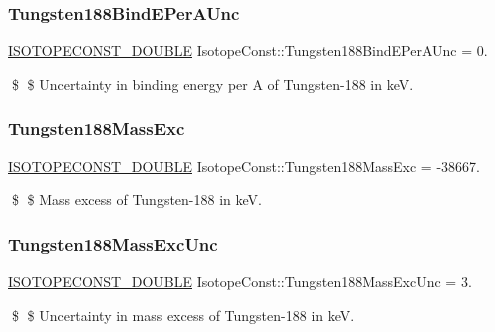 \subsubsection{\texorpdfstring{Tungsten188\+Bind\+E\+Per\+A\+Unc}{Tungsten188BindEPerAUnc}}
{\footnotesize\ttfamily \mbox{\hyperlink{group___isotope_const-_macros_ga8f45a7272ce02c0b4c65c44636ed719a}{I\+S\+O\+T\+O\+P\+E\+C\+O\+N\+S\+T\+\_\+\+D\+O\+U\+B\+LE}} Isotope\+Const\+::\+Tungsten188\+Bind\+E\+Per\+A\+Unc = 0.}

\$ \$ Uncertainty in binding energy per A of Tungsten-\/188 in keV. \mbox{\label{group___isotope_const-_tungsten-_w188_gafd20da016cd071a724fff9b652060a7f}} 
\subsubsection{\texorpdfstring{Tungsten188\+Mass\+Exc}{Tungsten188MassExc}}
{\footnotesize\ttfamily \mbox{\hyperlink{group___isotope_const-_macros_ga8f45a7272ce02c0b4c65c44636ed719a}{I\+S\+O\+T\+O\+P\+E\+C\+O\+N\+S\+T\+\_\+\+D\+O\+U\+B\+LE}} Isotope\+Const\+::\+Tungsten188\+Mass\+Exc = -\/38667.}

\$ \$ Mass excess of Tungsten-\/188 in keV. \mbox{\label{group___isotope_const-_tungsten-_w188_gae5741fb7f55162d2642fb6271e6eba32}} 
\subsubsection{\texorpdfstring{Tungsten188\+Mass\+Exc\+Unc}{Tungsten188MassExcUnc}}
{\footnotesize\ttfamily \mbox{\hyperlink{group___isotope_const-_macros_ga8f45a7272ce02c0b4c65c44636ed719a}{I\+S\+O\+T\+O\+P\+E\+C\+O\+N\+S\+T\+\_\+\+D\+O\+U\+B\+LE}} Isotope\+Const\+::\+Tungsten188\+Mass\+Exc\+Unc = 3.}

\$ \$ Uncertainty in mass excess of Tungsten-\/188 in keV. \mbox{\label{group___isotope_const-_tungsten-_w188_ga77306ef55da9e589d0d244912899d8e9}} 
